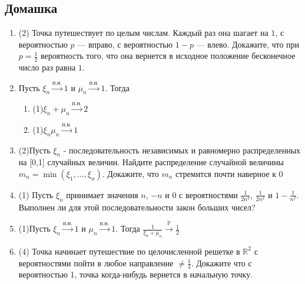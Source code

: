 \documentclass[a4paper, 14pt]{extarticle}
\begin{document}
\subsection*{Домашка}
\begin{enumerate}
\item (2) Точка путешествует по целым числам. Каждый раз она шагает на $1$, с вероятностью $p$ — вправо, с вероятностью $1-p$ — влево. 
Докажите, что при $p = \frac{1}{2}$ вероятность того, что она вернется в исходное положение бесконечное число раз равна $1$.


\item Пусть $\xi_n \overset{\textrm{п.н.}}{\to} 1$ и $\mu_n \overset{\textrm{п.н.}}{\to} 1$. 
Тогда 
\begin{enumerate}
\item (1)$\xi_n + \mu_n \overset{\textrm{п.н.}}{\to} 2$
\item (1)$\xi_n\mu_n \overset{\textrm{п.н.}}{\to} 1$
\end{enumerate}

\item (2)Пусть $\xi_n$ - последовательность независимых и равномерно распределенных на [0,1] случайных величин. 
Найдите распределение случайной величины $m_n=\min (\xi_1,\ldots,\xi_n)$. Докажите, что $m_n$ стремится почти наверное к 0

\item (1) Пусть $\xi_n$ принимает значения $n$, $-n$ и $0$ с вероятностями $\frac{1}{2n^2}$, $\frac{1}{2n^2}$ и $1 - \frac{1}{n^2}$.
Выполнен ли для этой последовательности закон больших чисел? 

\item (1)Пусть $\xi_n \overset{\textrm{п.н.}}{\to} 1$ и $\mu_n \overset{\textrm{п.н.}}{\to} 1$. 
Тогда $\frac{1}{\xi_n + \mu_n} \overset{\mathbb{P}}{\to} \frac{1}{2}$

\item (4) Точка начинает путешествие по целочисленной решетке в $\mathbb{R}^2$ с вероятностями пойти в любое направление $\neq \frac{1}{4}$.
Докажите что с вероятностью 1, точка когда-нибудь вернется в начальную точку.



\end{enumerate}
\end{document}
